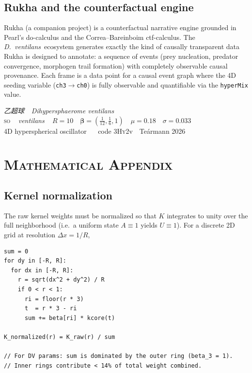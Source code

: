 \documentclass[11pt,a4paper]{article}
\newcommand{\spc}[1]{\textit{#1}}  %
\newcommand{\ventilans}{\textit{ventilans}}
\newcommand{\DV}{\spc{D.\ ventilans}}
\newcommand{\SO}{\textsc{so}}
\begin{document}
\subsection{Rukha and the counterfactual engine}
Rukha (a companion project) is a counterfactual narrative engine grounded
in Pearl's do-calculus and the Correa--Bareinboim ctf-calculus. The \DV\
ecosystem generates exactly the kind of causally transparent data Rukha
is designed to annotate: a sequence of events (prey nucleation, predator
convergence, morphogen trail formation) with completely observable causal
provenance. Each frame is a data point for a causal event graph where the
4D seeding variable (\texttt{ch3}$\to$\texttt{ch0}) is fully observable
and quantifiable via the \texttt{hyperMix} value.

\vspace{22pt}
\begin{center}
{\Large\itshape\color{accent}乙超球 \,\textperiodcentered\, \textit{Dihypersphaerome ventilans}}\\[3pt]
{\sffamily\footnotesize\color{muted}
  \SO\ \,\textperiodcentered\, \ventilans\ \,\textperiodcentered\, $R{=}10$ \,\textperiodcentered\,
  $\boldsymbol{\beta}{=}(\tfrac{1}{12},\tfrac{1}{6},1)$ \,\textperiodcentered\, $\mu{=}0.18$ \,\textperiodcentered\, $\sigma{=}0.033$\\
  4D hyperspherical oscillator \,\textperiodcentered\, \citealt{chan2020} \,\textperiodcentered\,
  code 3\textsc{Hy}2v \,\textperiodcentered\, Teármann 2026}
\end{center}

\appendix
\section*{\hfil\normalsize\scshape Mathematical Appendix \hfil}
\renewcommand{\thesubsection}{\Alph{subsection}}
\setcounter{subsection}{0}

\subsection{Kernel normalization}
The raw kernel weights must be normalized so that $K$ integrates to unity
over the full neighborhood (i.e.\ a uniform state $A\equiv 1$ yields
$U\equiv 1$). For a discrete 2D grid at resolution $\Delta x = 1/R$,

\begin{lstlisting}[language=pseudo, caption={Kernel normalization.}]
sum = 0
for dy in [-R, R]:
  for dx in [-R, R]:
    r = sqrt(dx^2 + dy^2) / R
    if 0 < r < 1:
      ri = floor(r * 3)
      t  = r * 3 - ri
      sum += beta[ri] * kcore(t)

K_normalized(r) = K_raw(r) / sum

// For DV params: sum is dominated by the outer ring (beta_3 = 1).
// Inner rings contribute < 14% of total weight combined.
\end{lstlisting}
\end{document}
